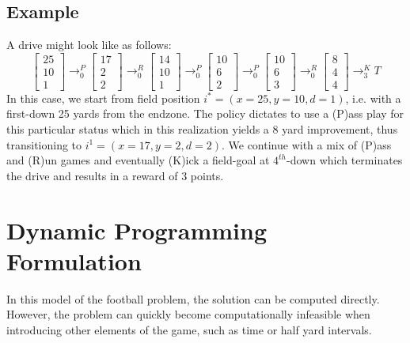 \documentclass[11pt, oneside]{article}   	%
\begin{document}
\subsection{Example}
A drive might look like as follows:
$$
\begin{bmatrix} 25\\[0.3em] 10 \\[0.3em] 1 \end{bmatrix}
\longrightarrow_0^P
\begin{bmatrix} 17\\[0.3em] 2 \\[0.3em] 2 \end{bmatrix}
\longrightarrow_0^R
\begin{bmatrix} 14\\[0.3em] 10 \\[0.3em] 1 \end{bmatrix}
\longrightarrow_0^P
\begin{bmatrix} 10\\[0.3em] 6 \\[0.3em] 2 \end{bmatrix}
\longrightarrow_0^P
\begin{bmatrix} 10\\[0.3em] 6 \\[0.3em] 3 \end{bmatrix}
\longrightarrow_0^R
\begin{bmatrix} 8\\[0.3em] 4 \\[0.3em] 4 \end{bmatrix}
\longrightarrow_3^K
T
$$
In this case, we start from field position $i^* = (x=25, y=10, d=1)$, i.e. with a first-down 25 yards from the endzone. The policy dictates to use a (P)ass play for this particular status which in this realization yields a 8 yard improvement, thus transitioning to $i^1 = (x=17, y=2, d=2)$. We continue with a mix of (P)ass and (R)un games and eventually (K)ick a field-goal at $4^{th}$-down which terminates the drive and results in a reward of 3 points.


\newpage
\section{Dynamic Programming Formulation}
In this model of the football problem, the solution can be computed directly. However, the problem can quickly become computationally infeasible when introducing other elements of the game, such as time or half yard intervals. 
\end{document}
